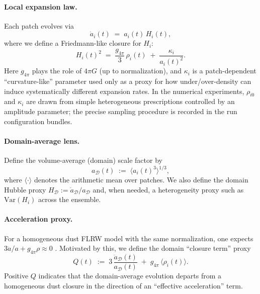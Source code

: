 \documentclass[11pt]{article}
\theoremstyle{definition}
\theoremstyle{plain}
\theoremstyle{remark}
\begin{document}
\paragraph{Local expansion law.}
Each patch evolves via
\begin{equation}
\dot a_i(t) \;=\; a_i(t)\,H_i(t),
\label{eq:toy2_ai_ode}
\end{equation}
where we define a Friedmann-like closure for $H_i$:
\begin{equation}
H_i(t)^2 \;=\; \frac{g_{4\pi}}{3}\,\rho_i(t) \;+\; \frac{\kappa_i}{a_i(t)^2}.
\label{eq:toy2_hi_closure}
\end{equation}
Here $g_{4\pi}$ plays the role of $4\pi G$ (up to normalization), and $\kappa_i$ is a patch-dependent ``curvature-like'' parameter used only as a proxy for how under/over-density can induce systematically different expansion rates. In the numerical experiments, $\rho_{i0}$ and $\kappa_i$ are drawn from simple heterogeneous prescriptions controlled by an amplitude parameter; the precise sampling procedure is recorded in the run configuration bundles.

\paragraph{Domain-average lens.}
Define the volume-average (domain) scale factor by
\begin{equation}
a_{\mathcal{D}}(t) \;:=\; \Big\langle a_i(t)^3\Big\rangle^{1/3},
\label{eq:toy2_aD}
\end{equation}
where $\langle\cdot\rangle$ denotes the arithmetic mean over patches.
We also define the domain Hubble proxy $H_{\mathcal{D}}:=\dot a_{\mathcal{D}}/a_{\mathcal{D}}$ and, when needed, a heterogeneity proxy such as $\mathrm{Var}(H_i)$ across the ensemble.

\paragraph{Acceleration proxy.}
For a homogeneous dust FLRW model with the same normalization, one expects $3\ddot{a}/a + g_{4\pi}\rho \approx 0$ \cite{Buchert2000Dust,Buchert2001PerfectFluid,Clarkson2011Averaging}.
Motivated by this, we define the domain ``closure term'' proxy
\begin{equation}
Q(t) \;:=\; 3\,\frac{\ddot a_{\mathcal{D}}(t)}{a_{\mathcal{D}}(t)} \;+\; g_{4\pi}\,\big\langle \rho_i(t)\big\rangle.
\label{eq:toy2_Q_def}
\end{equation}
Positive $Q$ indicates that the domain-average evolution departs from a homogeneous dust closure in the direction of an ``effective acceleration'' term.
\end{document}
